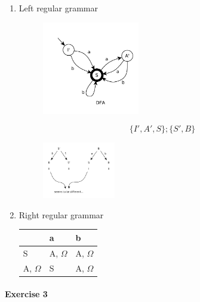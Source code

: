 \begin{enumerate}
    \item
    Left regular grammar
    \begin{figure}[H]
        \centerline{\includegraphics[width=0.4\textwidth]{img/44.pdf}}
    \end{figure}
    $$
        \{I', A', S\}; \{S', B\}
    $$
    \begin{figure}[H]
        \centerline{\includegraphics[width=0.3\textwidth]{img/45.pdf}}
    \end{figure}
    \item
    Right regular grammar
    \begin{table}[H]
        \centering
        \begin{tabular}{l|l|l}
            & a & b \\ \hline
            S & A, $\Omega$ & A, $\Omega$ \\ \hline
            A, $\Omega$ & S & A, $\Omega$ \\
        \end{tabular}
    \end{table}
\end{enumerate}

\paragraph{Exercise 3}
